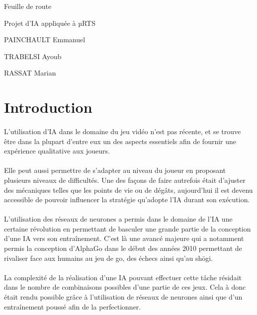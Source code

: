 \documentclass[french]{article}
\begin{document}
	
	\setcounter{sources}{1}
	\newcommand{\scount}{\up{\arabic{sources}}\stepcounter{sources}}
	
	\Huge{Feuille de route}
	
	\Large{Projet d'IA appliquée à µRTS} \hfill
	\vspace{10mm}
	
	\small
	\hfill PAINCHAULT Emmanuel
	
	\hfill TRABELSI Ayoub
	
	\hfill RASSAT Marian
	
	\vspace{5mm}
	
	\section*{Introduction}
	\paragraph*{}
	L’utilisation d’IA dans le domaine du jeu vidéo n’est pas récente, et se trouve être dans la plupart d’entre eux un des aspects essentiels afin de fournir une expérience qualitative aux joueurs.
	
	\paragraph*{}
	Elle peut aussi permettre de s’adapter au niveau du joueur en proposant plusieurs niveaux de difficultés. Une des façons de faire autrefois était d’ajuster des mécaniques telles que les points de vie ou de dégâts, aujourd’hui il est devenu accessible de pouvoir influencer la stratégie qu'adopte l’IA durant son exécution.
	
	\paragraph*{}
	L'utilisation des réseaux de neurones a permis dans le domaine de l'IA  une certaine révolution en permettant de basculer une grande partie de la conception d'une IA vers son entraînement. C'est là une avancé majeure qui a notamment permis la conception d'AlphaGo dans le début des années 2010 permettant de rivaliser face aux humains au jeu de go, des échecs ainsi qu'au shōgi.
	
	\paragraph*{}
	La complexité de la réalisation d'une IA pouvant effectuer cette tâche résidait dans le nombre de combinaisons possibles d'une partie de ces jeux. Cela à donc était rendu possible grâce à l'utilisation de réseaux de neurones ainsi que d'un entraînement poussé afin de la perfectionner.
	
\end{document}
